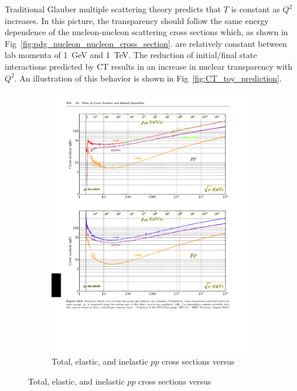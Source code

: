 Traditional Glauber multiple scattering theory predicts that $T$ is constant as
$Q^2$ increases.
In this picture, the transparency should follow the same
energy dependence of the nucleon-nucleon scattering cross sections which,
as shown in Fig~\ref{fig:pdg_nucleon_nucleon_cross_section}.
are relatively constant between lab momenta of
\SI{1}{\giga\electronvolt} and \SI{1}{\tera\electronvolt}.
The reduction of initial/final state interactions predicted by CT results in an
increase in nuclear transparency with $Q^2$.
An illustration of this behavior is shown in Fig~\ref{fig:CT_toy_prediction}.

\begin{figure}[!h]
    \centering
    \begin{subfigure}[b]{1.0\textwidth}
        \centering
        \includegraphics[width=1.0\textwidth]{chap2/pdg_pp_cross_section.pdf}
        \caption[Total, elastic, and inelastic $pp$ cross sections versus
                 $p_{lab}$ and $\sqrt{s}$.]{
                 Total, elastic, and inelastic $pp$ cross sections versus
}
\end{subfigure}
\end{figure}

